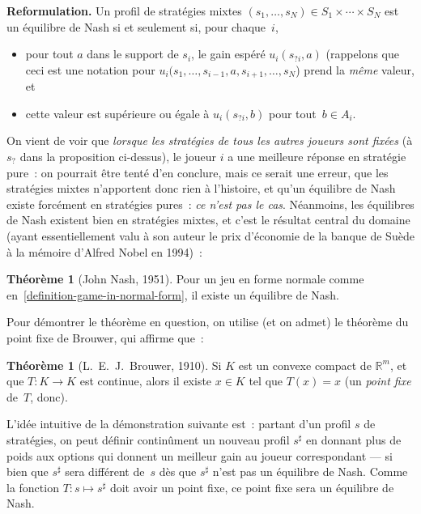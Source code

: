 \documentclass[12pt,a4paper]{article}
\theoremstyle{definition}
\newtheorem{thm}[comcnt]{Théorème}
\begin{document}
\textbf{Reformulation.}  Un profil de stratégies mixtes
$(s_1,\ldots,s_N) \in S_1\times \cdots\times S_N$ est un équilibre de
Nash si et seulement si, pour chaque $i$,
\begin{itemize}
\item pour tout $a$ dans le support de $s_i$, le gain espéré
  $u_i(s_{?i},a)$ (rappelons que ceci est une notation pour
  $u_i(s_1,\ldots,s_{i-1},a,s_{i+1},\ldots,s_N$) prend la \emph{même}
  valeur, et
\item cette valeur est supérieure ou égale à $u_i(s_{?i},b)$ pour
  tout $b\in A_i$.
\end{itemize}

\smallskip

On vient de voir que \emph{lorsque les stratégies de tous les autres
  joueurs sont fixées} (à $s_?$ dans la proposition ci-dessus), le
joueur $i$ a une meilleure réponse en stratégie pure : on pourrait
être tenté d'en conclure, mais ce serait une erreur, que les
stratégies mixtes n'apportent donc rien à l'histoire, et qu'un
équilibre de Nash existe forcément en stratégies pures : \emph{ce
  n'est pas le cas}.  Néanmoins, les équilibres de Nash existent bien
en stratégies mixtes, et c'est le résultat central du domaine (ayant
essentiellement valu à son auteur le prix d'économie de la banque de
Suède à la mémoire d'Alfred Nobel en 1994) :

\begin{thm}[John Nash, 1951]\label{theorem-nash-equilibria}
Pour un jeu en forme normale comme
en \ref{definition-game-in-normal-form}, il existe un équilibre de
Nash.
\end{thm}

Pour démontrer le théorème en question, on utilise (et on admet) le
théorème du point fixe de Brouwer, qui affirme que :

\begin{thm}[L. E. J. Brouwer, 1910]\label{brouwer-fixed-point-theorem}
Si $K$ est un convexe compact de $\mathbb{R}^m$, et que $T \colon K
\to K$ est continue, alors il existe $x\in K$ tel que $T(x) = x$ (un
\emph{point fixe} de $T$, donc).
\end{thm}

L'idée intuitive de la démonstration suivante est : partant d'un
profil $s$ de stratégies, on peut définir continûment un nouveau
profil $s^\sharp$ en donnant plus de poids aux options qui donnent un
meilleur gain au joueur correspondant — si bien que $s^\sharp$ sera
différent de $s$ dès que $s^\sharp$ n'est pas un équilibre de Nash.  Comme
la fonction $T \colon s \mapsto s^\sharp$ doit avoir un point fixe, ce point
fixe sera un équilibre de Nash.
\end{document}
